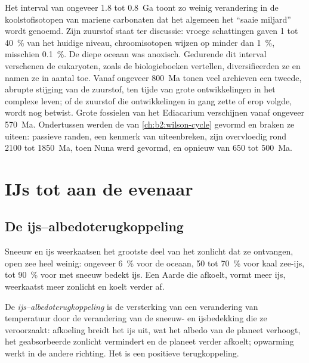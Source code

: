 Het interval van ongeveer 1.8 tot \qty{0.8}{Ga} toont zo weinig verandering in de koolstofisotopen van
mariene carbonaten dat het algemeen het ``saaie miljard'' wordt genoemd. Zijn zuurstof staat ter discussie: vroege
schattingen gaven 1 tot \qty{40}{\percent} van het huidige niveau, chroomisotopen wijzen op minder dan
\qty{1}{\percent}, misschien \qty{0.1}{\percent}. De diepe oceaan was anoxisch. Gedurende dit interval
verschenen de eukaryoten, zoals de biologieboeken vertellen, diversifieerden ze en namen ze in aantal toe. Vanaf ongeveer \qty{800}{Ma} tonen veel archieven
een tweede, abrupte stijging van de zuurstof, ten tijde van grote ontwikkelingen in het complexe leven; of
de zuurstof die ontwikkelingen in gang zette of erop volgde, wordt nog betwist. Grote fossielen van het Ediacarium
verschijnen vanaf ongeveer \qty{570}{Ma}. Ondertussen werden de  van \cref{ch:b2:wilson-cycle}
gevormd en braken ze uiteen: passieve randen, een kenmerk van uiteenbreken, zijn overvloedig rond 2100 tot
\qty{1850}{Ma}, toen Nuna werd gevormd, en opnieuw van 650 tot \qty{500}{Ma}.

\section{IJs tot aan de evenaar}\label{sec:b2:precambrian-earth:snowball}

\subsection*{De ijs--albedoterugkoppeling}

Sneeuw en ijs weerkaatsen het grootste deel van het zonlicht dat ze ontvangen, open zee heel weinig: ongeveer
\qty{6}{\percent} voor de oceaan, 50 tot \qty{70}{\percent} voor kaal zee-ijs, tot
\qty{90}{\percent} voor met sneeuw bedekt ijs. Een Aarde die afkoelt, vormt meer ijs, weerkaatst meer
zonlicht en koelt verder af.

\begin{definition}\label{def:b2:precambrian-earth:ice-albedo}
De \emph{ijs--albedoterugkoppeling} is de versterking van een verandering
van temperatuur door de verandering van de sneeuw- en ijsbedekking die ze veroorzaakt: afkoeling breidt het ijs uit, wat
het albedo van de planeet verhoogt, het geabsorbeerde zonlicht vermindert en de planeet verder afkoelt;
opwarming werkt in de andere richting. Het is een positieve terugkoppeling.
\end{definition}

